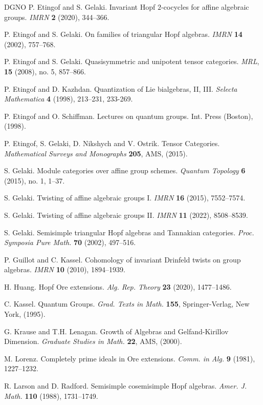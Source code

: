 \documentclass{amsart}
\numberwithin{equation}{section}
\theoremstyle{definition}
\begin{document}
\begin{thebibliography}{DGNO}
 P. Etingof and S. Gelaki. Invariant Hopf $2$-cocycles for affine algebraic groups. {\em IMRN} {\bf 2} (2020), 344--366.

 P. Etingof and S. Gelaki. On families of triangular Hopf algebras.
{\em IMRN} {\bf 14} (2002),
757--768.

 P. Etingof and S. Gelaki. Quasisymmetric and unipotent tensor
categories. {\em MRL}, {\bf 15} (2008),
no. 5, 857--866.

 P. Etingof and D. Kazhdan. Quantization of Lie
bialgebras, II, III. {\em Selecta Mathematica} {\bf 4} (1998), 213--231,
233-269.

 P. Etingof and O. Schiffman. Lectures on quantum groups. 
Int. Press (Boston), (1998).

 P. Etingof, S. Gelaki, D. Nikshych and V. Ostrik. Tensor Categories. \emph{Mathematical Surveys and Monographs} {\bf 205}, AMS, (2015).

 S. Gelaki. Module categories over affine group schemes. {\em Quantum Topology} {\bf 6} (2015), no. 1, 1--37.

 S. Gelaki. Twisting of affine algebraic groups I. {\em IMRN} {\bf 16} (2015), 7552--7574.

 S. Gelaki. Twisting of affine algebraic groups II. {\em IMRN} {\bf 11} (2022), 8508--8539.

 S. Gelaki. Semisimple triangular Hopf algebras and Tannakian
categories. {\em Proc. Symposia Pure Math.} {\bf
70} (2002), 497--516.

 P. Guillot and C. Kassel. Cohomology of invariant Drinfeld twists on group algebras. {\em IMRN} {\bf 10}  (2010), 1894--1939.

 H. Huang. Hopf Ore extensions. {\em Alg. Rep. Theory} {\bf 23} 
(2020), 1477--1486.

 C. Kassel. Quantum Groups. \emph{Grad. Texts in Math.} {\bf 155}, Springer-Verlag, New York, (1995).

 G. Krause and T.H. Lenagan. Growth of Algebras and Gelfand-Kirillov Dimension. \emph{Graduate Studies in Math.} {\bf 22}, AMS, (2000). 

 M. Lorenz. Completely prime ideals in Ore extensions. 
{\em Comm. in Alg.} {\bf 9} (1981), 1227--1232.

 R. Larson and D. Radford.
Semisimple cosemisimple Hopf algebras. \textit{Amer. J. Math.} \textbf{110}
(1988), 1731--1749.


\end{thebibliography}
\end{document}
